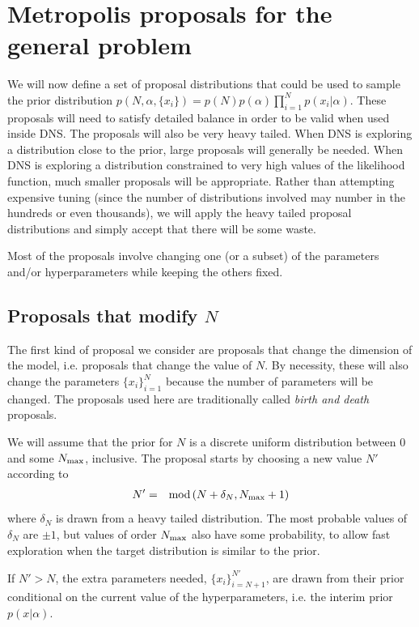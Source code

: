 \documentclass[letterpaper, 11pt]{article}
\begin{document}

\section{Metropolis proposals for the general problem}
We will now define a set of proposal distributions that could be used to
sample the prior distribution
$p(N, \alpha, \{x_i\}) = p(N) p(\alpha) \prod_{i=1}^N p(x_i | \alpha)$.
These proposals will need to satisfy detailed balance in order to be valid
when used inside DNS. The proposals will also be very heavy tailed. When
DNS is exploring a distribution close to the prior, large proposals will
generally be needed. When DNS is exploring a distribution constrained to
very high values of the likelihood function, much smaller proposals will be
appropriate. Rather than attempting expensive tuning (since the number of
distributions involved may number in the hundreds or even thousands), we will
apply the heavy tailed proposal distributions and simply accept that there will
be some waste.

Most of the proposals involve changing one (or a subset) of the parameters
and/or hyperparameters while keeping the others fixed.

\subsection{Proposals that modify $N$}
The first kind of proposal we consider are proposals that change the
dimension of the model, i.e. proposals that change the value of $N$. By
necessity, these will also change the parameters $\{x_i\}_{i=1}^N$ because
the number of parameters will be changed. The proposals used here are
traditionally called {\it birth and death} proposals.

We will assume that the prior for $N$ is a discrete uniform distribution
between 0 and some $N_{\rm max}$, inclusive. The proposal starts by choosing
a new value $N'$ according to
\begin{eqnarray}
N' &=& \textnormal{mod}\left(N + \delta_N, N_{\rm max} + 1\right)
\end{eqnarray}
where $\delta_N$ is drawn from a heavy tailed
distribution. The most probable values of $\delta_N$ are $\pm 1$, but values
of order $N_{\rm max}$ also have some probability, to allow fast exploration
when the target distribution is similar to the prior.

If $N' > N$, the extra parameters needed, $\{x_i\}_{i=N+1}^{N'}$,
are drawn from their prior conditional on the current value of the
hyperparameters, i.e. the interim prior $p(x | \alpha)$.
\end{document}
